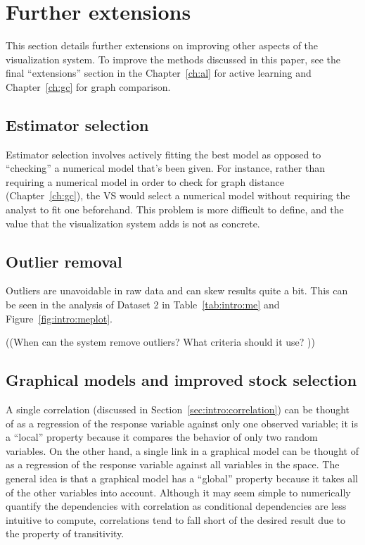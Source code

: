 \section{Further extensions}
\label{sec:futurework}

This section details further extensions on improving other aspects of the 
visualization system. To improve the methods discussed in this paper, see the 
final ``extensions'' section in the Chapter~\ref{ch:al} for active learning and 
Chapter~\ref{ch:gc} for graph comparison.

\subsection{Estimator selection}
\label{sec:futurework:estimatorselection}

Estimator selection involves actively fitting the best model as opposed to
``checking'' a numerical model that’s been given. For instance, rather than 
requiring a numerical model in order to check for graph distance 
(Chapter~\ref{ch:gc}), the VS would select a numerical model without requiring 
the analyst to fit one beforehand. This problem is more difficult
to define, and the value that the visualization system adds is not as concrete.

\subsection{Outlier removal}
\label{sec:futurework:outlier}

Outliers are unavoidable in raw data and can skew results quite a bit. This can 
be seen in the analysis of Dataset 2 in Table~\ref{tab:intro:me} and 
Figure~\ref{fig:intro:meplot}. 

((When can the system remove outliers? What criteria should it use? ))

\subsection{Graphical models and improved stock selection}
\label{sec:futurework:graphicalmodel}

A single correlation (discussed in Section~\ref{sec:intro:correlation}) can be 
thought of as a regression of the response variable
against only one observed variable; it is a ``local'' property because it
compares the behavior of only two random variables. On the other hand, a single
link in a graphical model can be thought of as a regression of the response
variable against all variables in the space. The general idea is that a 
graphical model has a ``global'' property because it takes all
of the other variables into account. Although it may seem simple to numerically
quantify the dependencies with correlation as conditional dependencies are less
intuitive to compute, correlations tend to fall short of the desired result due
to the property of transitivity.

